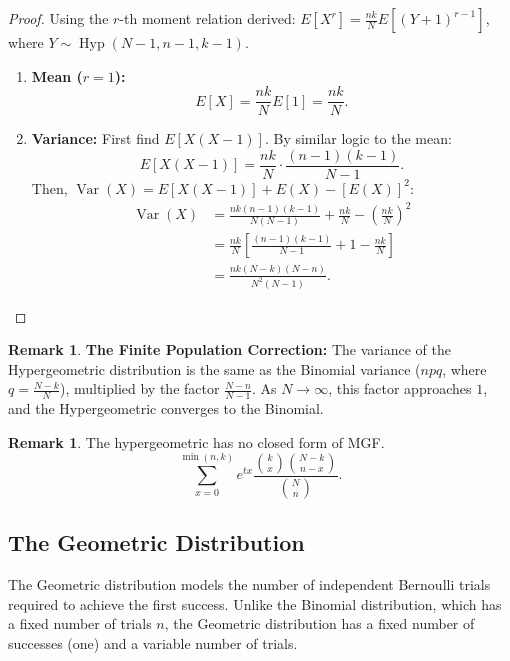 \documentclass[12pt,a4paper]{report}
\theoremstyle{definition}
\newtheorem{remark}[thm]{Remark}
\theoremstyle{plain}
\theoremstyle{definition}
\begin{document}
\begin{proof}
Using the $r$-th moment relation derived: $E[X^r] = \frac{nk}{N} E[(Y+1)^{r-1}]$, where $Y \sim \operatorname{Hyp}(N-1, n-1, k-1)$.
\begin{enumerate}
\item \textbf{Mean ($r=1$):} \[E[X] = \frac{nk}{N} E[1] = \frac{nk}{N}.\]
\item \textbf{Variance:} First find $E[X(X-1)]$. By similar logic to the mean:\[ E[X(X-1)] = \frac{nk}{N} \cdot \frac{(n-1)(k-1)}{N-1}. \]Then, $\operatorname{Var}(X) = E[X(X-1)] + E(X) - [E(X)]^2$:
\begin{align*}
\operatorname{Var}(X) &= \frac{nk(n-1)(k-1)}{N(N-1)} + \frac{nk}{N} - \left(\frac{nk}{N}\right)^2\\
&= \frac{nk}{N} \left[ \frac{(n-1)(k-1)}{N-1} + 1 - \frac{nk}{N} \right]\\
&= \frac{nk(N-k)(N-n)}{N^2(N-1)}.
\end{align*}
\end{enumerate}
\end{proof}




\begin{remark}
\textbf{The Finite Population Correction:} The variance of the Hypergeometric distribution is the same as the Binomial variance ($npq$, where $q = \frac{N-k}{N}$), multiplied by the factor $\frac{N-n}{N-1}$. As $N \to \infty$, this factor approaches $1$, and the Hypergeometric converges to the Binomial.
\end{remark}




\begin{remark}
The hypergeometric has no closed form of MGF. \[\sum^{\min(n,k)}_{x=0}e^{tx}\frac{\binom{k}{x}\binom{N-k}{n-x}}{\binom{N}{n}}.\]
\end{remark}









\subsection{The Geometric Distribution}
The Geometric distribution models the number of independent Bernoulli trials required to achieve the first success. Unlike the Binomial distribution, which has a fixed number of trials $n$, the Geometric distribution has a fixed number of successes (one) and a variable number of trials.
\end{document}
